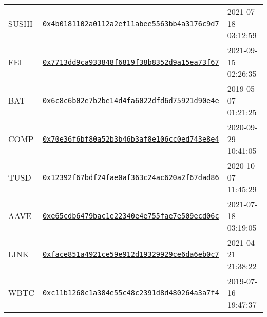 \begin{tabular}{lll}
SUSHI & \href{https://etherscan.io/address/0x4b0181102a0112a2ef11abee5563bb4a3176c9d7}{\tt 0x4b0181102a0112a2ef11abee5563bb4a3176c9d7} &          2021-07-18 03:12:59 \\
  FEI & \href{https://etherscan.io/address/0x7713dd9ca933848f6819f38b8352d9a15ea73f67}{\tt 0x7713dd9ca933848f6819f38b8352d9a15ea73f67} &          2021-09-15 02:26:35 \\
  BAT & \href{https://etherscan.io/address/0x6c8c6b02e7b2be14d4fa6022dfd6d75921d90e4e}{\tt 0x6c8c6b02e7b2be14d4fa6022dfd6d75921d90e4e} &          2019-05-07 01:21:25 \\
 COMP & \href{https://etherscan.io/address/0x70e36f6bf80a52b3b46b3af8e106cc0ed743e8e4}{\tt 0x70e36f6bf80a52b3b46b3af8e106cc0ed743e8e4} &          2020-09-29 10:41:05 \\
 TUSD & \href{https://etherscan.io/address/0x12392f67bdf24fae0af363c24ac620a2f67dad86}{\tt 0x12392f67bdf24fae0af363c24ac620a2f67dad86} &          2020-10-07 11:45:29 \\
 AAVE & \href{https://etherscan.io/address/0xe65cdb6479bac1e22340e4e755fae7e509ecd06c}{\tt 0xe65cdb6479bac1e22340e4e755fae7e509ecd06c} &          2021-07-18 03:19:05 \\
 LINK & \href{https://etherscan.io/address/0xface851a4921ce59e912d19329929ce6da6eb0c7}{\tt 0xface851a4921ce59e912d19329929ce6da6eb0c7} &          2021-04-21 21:38:22 \\
 WBTC & \href{https://etherscan.io/address/0xc11b1268c1a384e55c48c2391d8d480264a3a7f4}{\tt 0xc11b1268c1a384e55c48c2391d8d480264a3a7f4} &          2019-07-16 19:47:37 \\
\bottomrule
\end{tabular}
